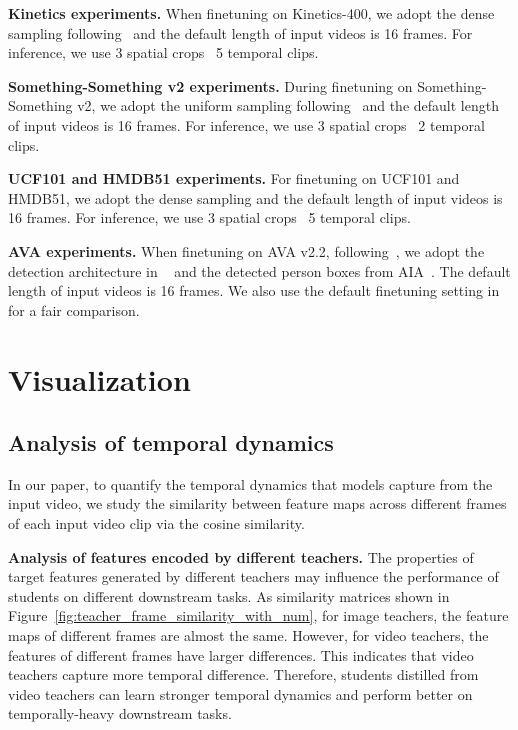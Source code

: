 \documentclass[10pt,twocolumn,letterpaper]{article}
\def\x{}
\begin{document}
\vspace{0.05in}
\noindent \textbf{Kinetics experiments.} When finetuning on Kinetics-400, we adopt the dense sampling following~\cite{quovadis,slowfast} and the default length of input videos is 16 frames. For inference, we use 3 spatial crops \x~5 temporal clips.

\vspace{0.05in}
\noindent \textbf{Something-Something v2 experiments.} During finetuning on Something-Something v2, we adopt the uniform sampling following~\cite{tsn} and the default length of input videos is 16 frames. For inference, we use 3 spatial crops \x~2 temporal clips.

\vspace{0.05in}
\noindent \textbf{UCF101 and HMDB51 experiments.} For finetuning on UCF101 and HMDB51, we adopt the dense sampling and the default length of input videos is 16 frames. For inference, we use 3 spatial crops \x~5 temporal clips.

\vspace{0.05in}
\noindent \textbf{AVA experiments.} When finetuning on AVA v2.2, following~\cite{tong2022videomae}, we adopt the detection architecture in ~\cite{slowfast} and the detected person boxes from AIA~\cite{tang2020asynchronous}. The default length of input videos is 16 frames. We also use the default finetuning setting in \cite{tong2022videomae} for a fair comparison.

\section{Visualization}

\subsection{Analysis of temporal dynamics}

In our paper, to quantify the temporal dynamics that models capture from the input video, we study the similarity between feature maps across different frames of each input video clip via the cosine similarity. 

\noindent \textbf{Analysis of features encoded by different teachers.}
The properties of target features generated by different teachers may influence the performance of students on different downstream tasks. As similarity matrices shown in Figure~\ref{fig:teacher_frame_similarity_with_num},  for image teachers, the feature maps of different frames are almost the same. However, for video teachers, the features of different frames have larger differences. This indicates that video teachers capture more temporal difference. Therefore, students distilled from video teachers can learn stronger temporal dynamics and perform better on temporally-heavy downstream tasks.
\end{document}

